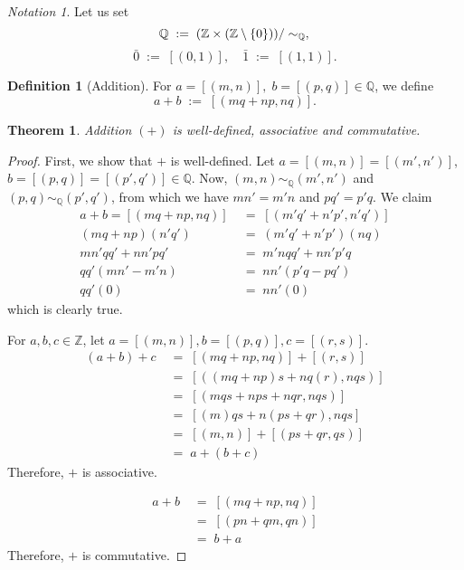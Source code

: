 \documentclass[10pt]{article}
\newtheorem{theorem}{Theorem}[section]
\theoremstyle{definition}
\newtheorem*{definition}{Definition}
\theoremstyle{remark}
\newtheorem*{notation}{Notation}
\newcommand{\Z}{\mathbb{Z}}
\newcommand{\Q}{\mathbb{Q}}
\newcommand{\Zm}{\Z\times(\Z\setminus\{0\})}
\newcommand{\simQ}{\sim_{\Q}}
\begin{document}
        \begin{notation}
        Let us set
        \[
                \Q \;:=\; (\Zm)/\simQ,\\
        \]
        \[
                \bar{0} \;:=\; [(0, 1)], \quad
                \bar{1} \;:=\; [(1, 1)].
        \]
        \end{notation}

        \begin{definition}[Addition]
        For $a = [(m, n)],\; b = [(p, q)] \in \Q$, we define
        \[
                a + b \;:=\; [(mq + np, nq)].
        \]
        \end{definition}
        
        \begin{theorem}
                Addition $(+)$ is well-defined, associative and commutative.
        \end{theorem}
        \begin{proof}
                First, we show that $+$ is well-defined.
                Let $a = [(m, n)] = [(m', n')]$, $b = [(p, q)] = [(p', q')] \in \Q$.
                Now, $(m, n) \simQ (m' , n')$ and $(p, q) \simQ (p', q')$, from which we have 
                $mn' = m'n$ and $pq' = p'q$.
                We claim 
                \begin{align*}
                a + b = [(mq + np, nq)] \;&=\; [(m'q' + n'p', n'q')] \\
                (mq + np)(n'q') \;&=\; (m'q' + n'p')(nq) \\
                mn'qq' + nn'pq' \;&=\; m'nqq' + nn'p'q \\
                qq'(mn' - m'n) \;&=\; nn'(p'q - pq') \\
                qq'(0) \;&=\; nn'(0)
                \end{align*}
                which is clearly true.

                For $a,b,c \in \Z$, let $a = [(m, n)], b = [(p, q)], c = [(r, s)]$.
                \begin{align*}
                        (a + b) + c \;&=\; [(mq + np, nq)] + [(r, s)] \\
                                \;&=\; [((mq + np)s + nq(r), nqs)] \\
                                \;&=\; [(mqs + nps + nqr, nqs)] \\
                                \;&=\; [(m)qs + n(ps + qr), nqs] \\
                                \;&=\; [(m, n)] + [(ps + qr, qs)] \\
                                \;&=\; a + (b + c)
                \end{align*}
                Therefore, $+$ is associative.

                \begin{align*}
                        a + b \;&=\; [(mq + np, nq)] \\
                                \;&=\; [(pn + qm, qn)] \\
                                \;&=\; b + a
                \end{align*}
                Therefore, $+$ is commutative.
        \end{proof}
\end{document}
